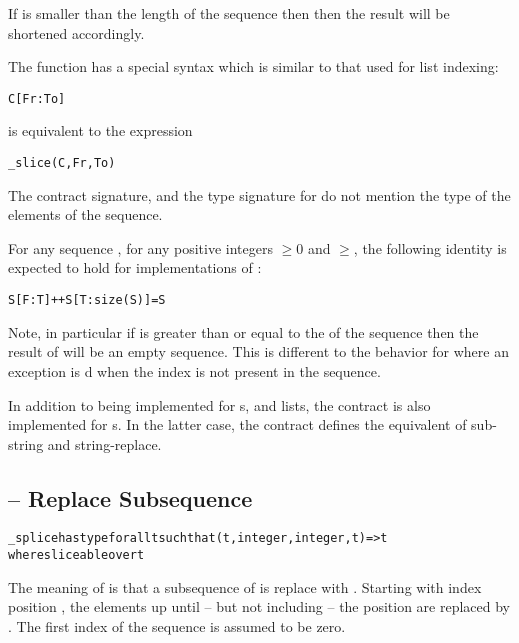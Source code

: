 If  is smaller than the length of the sequence then then the result will be shortened accordingly.

The  function has a special syntax which is similar to that used for list indexing:
\begin{alltt}
C[Fr:To]
\end{alltt}
is equivalent to the expression
\begin{alltt}
\_slice(C,Fr,To)
\end{alltt}

\begin{aside}
The contract signature, and the type signature for  do not mention the type of the elements of the sequence.
\end{aside}

\begin{aside}
For any sequence , for any positive integers  $\ge0$ and $\ge$, the following identity is expected to hold for implementations of :
\begin{alltt}
S[F:T]++S[T:size(S)] = S
\end{alltt}
Note, in particular if  is greater than or equal to the  of the sequence then the result of  will be an empty sequence. This is different to the behavior for  where an exception is d when the index is not present in the sequence.
\end{aside}

\begin{aside}
In addition to being implemented for s, and  lists, the  contract is also implemented for s. In the latter case, the  contract defines the equivalent of sub-string and string-replace.
\end{aside}

\subsection{ -- Replace Subsequence}
\label{spliceFunction}
\begin{alltt}
\_splice has type for all t such that (t,integer,integer,t)=>t
                  where sliceable over t
\end{alltt}
The meaning of  is that a subsequence of  is replace with . Starting with index position , the elements up until -- but not including -- the position  are replaced by . The first index of the sequence is assumed to be zero.

